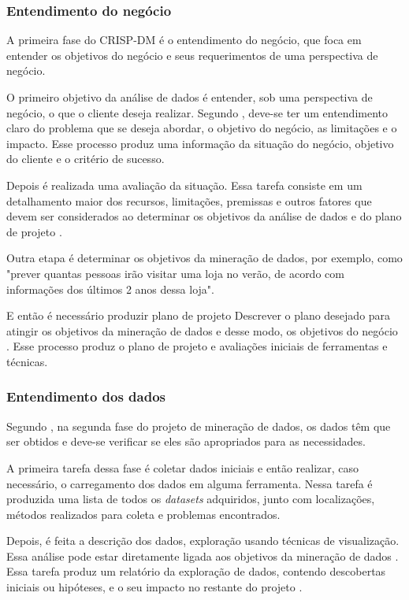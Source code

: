 \subsubsection{Entendimento do negócio}
A primeira fase do CRISP-DM é o entendimento do negócio, que foca em entender os objetivos do negócio e seus requerimentos de uma perspectiva de negócio.

O primeiro objetivo da análise de dados é entender, sob uma perspectiva de negócio, o que o cliente deseja realizar. Segundo , deve-se ter um entendimento claro do problema que se deseja abordar, o objetivo do negócio, as limitações e o impacto. Esse processo produz uma informação da situação do negócio, objetivo do cliente e o critério de sucesso.

Depois é realizada uma avaliação da situação. Essa tarefa consiste em um detalhamento maior dos recursos, limitações, premissas e outros fatores que devem ser considerados ao determinar os objetivos da análise de dados e do plano de projeto \citep{crispmanual}.

Outra etapa é determinar os objetivos da mineração de dados, por exemplo, como "prever quantas pessoas irão visitar uma loja no verão, de acordo com informações dos últimos 2 anos dessa loja".

E então é necessário produzir plano de projeto Descrever o plano desejado para atingir os objetivos da mineração de dados e desse modo, os objetivos do negócio \citep{crispmanual}. Esse processo produz o plano de projeto e avaliações iniciais de ferramentas e técnicas.

\subsubsection{Entendimento dos dados}
Segundo , na segunda fase do projeto de mineração de dados, os dados têm que ser obtidos e deve-se verificar se eles são apropriados para as necessidades.

A primeira tarefa dessa fase é coletar dados iniciais e então realizar, caso necessário, o carregamento dos dados em alguma ferramenta. Nessa tarefa é produzida uma lista de todos os \textit{datasets} adquiridos, junto com localizações, métodos realizados para coleta e problemas encontrados.

Depois, é feita a descrição dos dados, exploração usando técnicas de visualização. Essa análise pode estar diretamente ligada aos objetivos da mineração de dados \citep{crispmanual}. Essa tarefa produz um relatório da exploração de dados, contendo descobertas iniciais ou hipóteses, e o seu impacto no restante do projeto \citep{crispmanual}.

